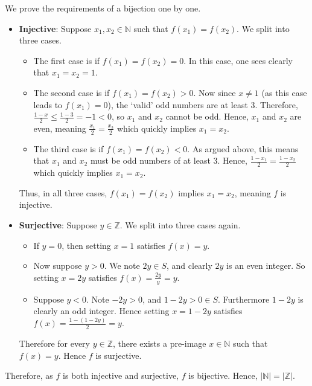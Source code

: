\begin{questions}
    \item We prove the requirements of a bijection one by one.
    \begin{itemize}
        \item \textbf{Injective}: Suppose $x_1, x_2 \in \mathbb{N}$ such that $f(x_1) = f(x_2)$. We split into three cases.
        \begin{itemize}
            \item The first case is if $f(x_1) = f(x_2) = 0$. In this case, one sees clearly that $x_1 = x_2 = 1$.
            \item The second case is if $f(x_1) = f(x_2) > 0$. Now since $x \neq 1$ (as this case leads to $f(x_1) = 0$), the `valid' odd numbers are at least 3. Therefore, $\frac{1-x}{2} \leq \frac{1-3}{2} = -1 < 0$, so $x_1$ and $x_2$ cannot be odd. Hence, $x_1$ and $x_2$ are even, meaning $\frac{x_1}{2} = \frac{x_2}{2}$ which quickly implies $x_1 = x_2$.
            \item The third case is if $f(x_1) = f(x_2) < 0$. As argued above, this means that $x_1$ and $x_2$ must be odd numbers of at least 3. Hence, $\frac{1-x_1}{2} = \frac{1-x_2}{2}$ which quickly implies $x_1 = x_2$.
        \end{itemize}
        Thus, in all three cases, $f(x_1) = f(x_2)$ implies $x_1 = x_2$, meaning $f$ is injective.
        \item \textbf{Surjective}: Suppose $y \in \mathbb{Z}$. We split into three cases again.
        \begin{itemize}
            \item If $y = 0$, then setting $x = 1$ satisfies $f(x) = y$.
            \item Now suppose $y > 0$. We note $2y \in S$, and clearly $2y$ is an even integer. So setting $x = 2y$ satisfies $f(x) = \frac{2y}{y} = y$.
            \item Suppose $y < 0$. Note $-2y > 0$, and $1 - 2y > 0 \in S$. Furthermore $1 - 2y$ is clearly an odd integer. Hence setting $x = 1 - 2y$ satisfies $f(x) = \frac{1-(1-2y)}{2} = y$.
        \end{itemize}
        Therefore for every $y \in \mathbb{Z}$, there exists a pre-image $x \in \mathbb{N}$ such that $f(x) = y$. Hence $f$ is surjective.
    \end{itemize}
    Therefore, as $f$ is both injective and surjective, $f$ is bijective. Hence, $|\mathbb{N}| = |\mathbb{Z}|$.
\end{questions}

